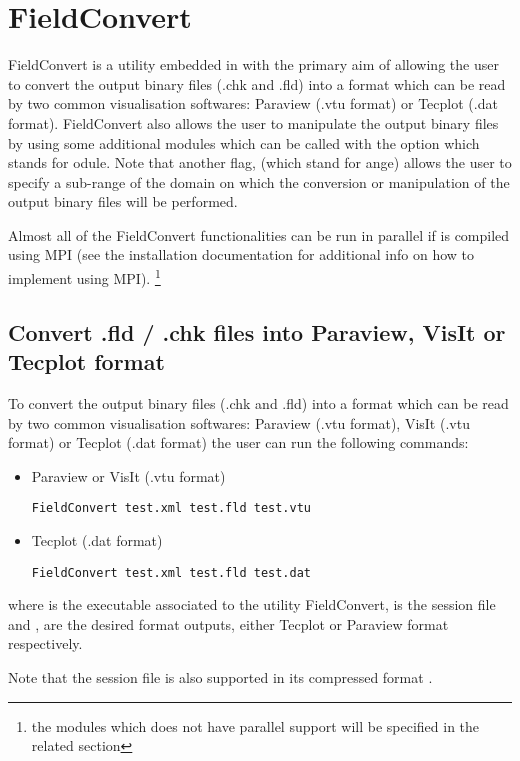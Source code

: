 \chapter{FieldConvert}
\label{s:utilities:fieldconvert}
FieldConvert is a utility embedded in \nekpp with the primary 
aim of allowing the user to convert the \nekpp output binary files 
(.chk and .fld) into a format which can be read by two common 
visualisation softwares: Paraview (.vtu format) or Tecplot (.dat 
format). FieldConvert also allows the user to manipulate the 
\nekpp output binary files by using some additional modules 
which can be called with the option  which stands 
for odule. Note that another flag,  (which stand for 
ange) allows the user to specify a sub-range of the domain 
on which the conversion or manipulation of the \nekpp output binary
files will be performed. 

Almost all of the FieldConvert functionalities can be run in parallel if \nekpp 
is compiled using MPI (see the installation documentation for additional 
info on how to implement \nekpp using MPI). \footnote{the modules which 
does not have parallel support will be specified in the related section}
%
%
%
\section{Convert .fld / .chk files into Paraview, VisIt or Tecplot format}
\label{s:utilities:fieldconvert:sub:convert}
To convert the \nekpp output binary files (.chk and .fld) into a
format which can be read by two common visualisation softwares:
Paraview (.vtu format), VisIt (.vtu format) or Tecplot (.dat format)
the user can run the following commands:
%
\begin{itemize}
\item Paraview or VisIt (.vtu format)
%
\begin{lstlisting}[style=BashInputStyle]
FieldConvert test.xml test.fld test.vtu
\end{lstlisting}
%
\item Tecplot (.dat format)
%
\begin{lstlisting}[style=BashInputStyle]
FieldConvert test.xml test.fld test.dat
\end{lstlisting}
%
\end{itemize}
%
where  is the executable associated to the utility 
FieldConvert,  is the session file and , 
 are the desired format outputs, either Tecplot or 
Paraview format respectively. 
%
\begin{tipbox}
Note that the session file is also supported 
in its compressed format .
\end{tipbox}
%
%
%
